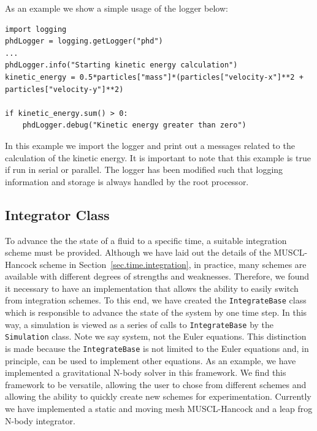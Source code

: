As an example we show a simple usage of the logger below:
\begin{lstlisting}
import logging
phdLogger = logging.getLogger("phd")
...
phdLogger.info("Starting kinetic energy calculation")
kinetic_energy = 0.5*particles["mass"]*(particles["velocity-x"]**2 + particles["velocity-y"]**2)

if kinetic_energy.sum() > 0:
	phdLogger.debug("Kinetic energy greater than zero")
\end{lstlisting}
In this example we import the logger and print out a messages related to the calculation of the
kinetic energy. It is important to note that this example is true if run in serial or parallel. The logger
has been modified such that logging information and storage is always handled by the root processor.

\subsection{Integrator Class}
\label{sec.integrator}
To advance the the state of a fluid to a specific time, a suitable integration
scheme must be provided. Although we have laid out the details of the MUSCL-Hancock scheme
in Section~\ref{sec.time.integration}, in practice, many schemes are available with different degrees of 
strengths and weaknesses. Therefore, we found it necessary to have an implementation
that allows the ability to easily switch from integration schemes. To this end, we have
created the \lstinline{IntegrateBase} class which is responsible to advance the state
of the system by one time step. In this way, a simulation is viewed as a series of calls
to \lstinline{IntegrateBase} by the \lstinline{Simulation} class.
Note we say system, not the Euler equations. This
distinction is made because the \lstinline{IntegrateBase} is not limited to the Euler
equations and, in principle, can be used to implement other equations. As an example,
we have implemented a gravitational N-body solver in this framework. We find
this framework to be versatile, allowing the user to chose from different schemes
and allowing the ability to quickly create new schemes for experimentation.
Currently we have implemented a static and moving mesh MUSCL-Hancock and a leap
frog N-body integrator.

